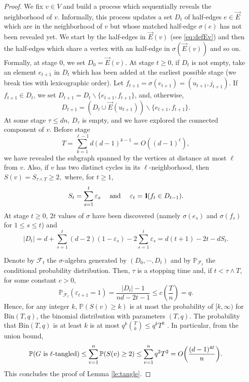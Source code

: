 \documentclass[11pt]{article}
\newcommand{\dP}{\mathbb{P}}
\newcommand{\cF}{\mathcal {F}}
\newcommand{\Bin}{ \mathrm{Bin}}
\newcommand{\PAR}[1]{{{\left(#1\right)}}} %
\newcommand{\1}{1\!\!{\sf I}}\newcommand{\IND}{\1}
\newcommand{\veps}{\varepsilon}
\newcommand{\si}{\sigma}
\begin{document}
\begin{proof} We fix $v \in V$ and build a process which sequentially reveals the neighborhood of $v$. Informally, this process  updates a set $D_t$ of half-edges $e \in \vec E$ which are in the neighborhood of $v$ but whose matched half-edge $\sigma(e)$ has not been revealed yet. We start by the half-edges in $\vec E(v)$ (see \eqref{eq:defEv}) and then the half-edges which share a vertex  with an half-edge in $\sigma(\vec E(v))$ and so on. Formally, at stage $0$, we set $D_0 = \vec E(v)$.  At stage $t \geq 0$, if $D_t$ is not empty, take an element $e_{t+1}$ in $D_t$ which has been added at the earliest possible stage (we break ties with lexicographic order). Let $f_{t+1} = \si(e_{t+1}) = (u_{t+1},j_{t+1})$.  If  $f_{t+1}  \in D_{t}$, we set $D_{t+1} = D_t \backslash \{ e_{t+1}, f_{t+1} \}$, and, otherwise,  $$D_{t+1} =  \PAR{D_t \cup \vec E(u_{t+1} )  } \backslash \{ e_{t+1} , f_{t+1}\}.$$
 At some stage $\tau \leq d n$, $D_\tau$ is empty, and we have explored the connected component of $v$. Before stage 
$$ T = \sum_{k = 1}^{\ell -1} d (d-1)^{k-1} = O \PAR{ (d-1)^\ell} ,$$
 we have revealed the subgraph spanned by the vertices at distance at most  $\ell$ from $v$. Also, if $v$ has two distinct cycles in its $\ell$-neighborhood, then
$
S(v) = S_{\tau \wedge T}  \geq 2, 
$
where, for $t \geq 1$,
$$
S_t =  \sum_{s= 1}^{t} \veps_{s} \quad   \hbox{ and } \quad \veps_t = \IND ( f_{t} \in D_{t-1} ). 
$$
At stage $t \geq 0$, $2t$ values of $\sigma$ have been discovered (namely $\sigma(e_s)$ and  $\sigma(f_s)$ for $1 \leq s \leq t$) and 
$$
|D_t | = d + \sum_{s=1}^t (d-2)( 1 - \veps_s)  - 2 \sum_{s=1}^t \veps_s =d (t +1) - 2 t -d S_t. 
$$

Denote by $\cF_t$ the $\sigma$-algebra generated by $(D_0, \cdots, D_{t})$ and by $\dP_{\cF_t}$ the conditional probability distribution. Then, $\tau$ is a stopping time and, if $t < \tau \wedge T$, for some constant $c >0$, 
$$
\dP_{\cF_t} ( \veps_{t+1} = 1) = \frac{|D_t| - 1 }{nd - 2 t  -1}   \leq c \PAR{ \frac{ T }{n} } = q. 
$$
Hence, for any integer $k$, $\dP( S(v) \geq k)$ is at most the probability of $[k,\infty)$ for $\Bin(T,q)$, the binomial distribution with parameters $(T,q)$. The probability that $\Bin(T,q)$ is at least $k$ is at most $q^k { T \choose k} \leq q^k T^k$ . In particular, from the union bound,  
$$
\dP \PAR{ G \hbox{ is $\ell$-tangled}}\leq \sum_{v=1} ^n  \dP ( S(v) \geq 2)  \leq \sum_{v=1} ^n  q^2 T^2   = O \PAR{ \frac{ (d-1)^{4 \ell}  }{n}}.
$$
This concludes the proof of Lemma \ref{le:tangle}. 
\end{proof}
\end{document}

